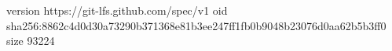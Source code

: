 version https://git-lfs.github.com/spec/v1
oid sha256:8862c4d0d30a73290b371368e81b3ee247ff1fb0b9048b23076d0aa62b5b3ff0
size 93224
